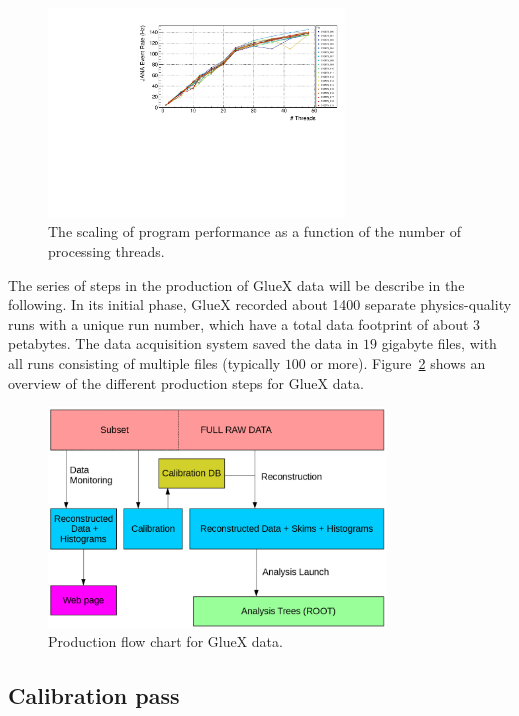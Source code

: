 \begin{figure}[h!]\centering
\includegraphics[width=0.7\textwidth]{figures/OfflineMonitor_PlotA.pdf}
\caption[]{\label{fig:offline_monitorA}The scaling of program performance as a function of
the number of processing threads.}
\end{figure}

The series of steps in the production of GlueX data will be describe in the following. In its initial phase, GlueX recorded about 1400 separate physics-quality runs with a unique run number, which have a total data footprint of about 3 petabytes. The data acquisition system saved the data in $19$ gigabyte files, with all runs consisting of multiple files (typically $100$ or more). Figure~\ref{fig:production_overview} shows an overview of the different production steps for GlueX data. 

\begin{figure}[h!]\centering
\includegraphics[width=0.8\textwidth]{figures/production_overview_calib.png}
\caption[]{\label{fig:production_overview}Production flow chart for GlueX data.} 
\end{figure}

\subsection{Calibration pass \label{sec:reccalibration}}

